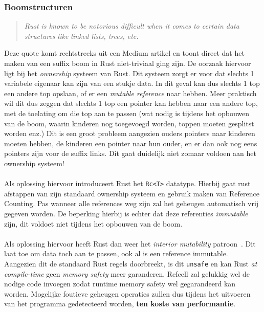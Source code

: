 \subsubsection{Boomstructuren}
\begin{quote}
    \textit{Rust is known to be notorious difficult when it comes to certain data structures like linked lists, trees, etc. \cite{rust_difficulty_quote}}
\end{quote}
Deze quote komt rechtstreeks uit een Medium artikel en toont direct dat het maken van een suffix boom in Rust niet-triviaal ging zijn.
De oorzaak hiervoor ligt bij het \textit{ownership} systeem van Rust.
Dit systeem zorgt er voor dat slechts 1 variabele eigenaar kan zijn van een stukje data.
In dit geval kan dus slechts 1 top een andere top opslaan, of er een \textit{mutable reference} naar hebben.
Meer praktisch wil dit dus zeggen dat slechts 1 top een pointer kan hebben naar een andere top, met de toelating om die top aan te passen (wat nodig is tijdens het opbouwen van de boom, waarin kinderen nog toegevoegd worden, toppen moeten gesplitst worden enz.)
Dit is een groot probleem aangezien ouders pointers naar kinderen moeten hebben, de kinderen een pointer naar hun ouder, en er dan ook nog eens pointers zijn voor de suffix links.
Dit gaat duidelijk niet zomaar voldoen aan het ownership systeem!
\\ \\
Als oplossing hiervoor introduceert Rust het \texttt{Rc<T>} datatype.
Hierbij gaat rust afstappen van zijn standaard ownership systeem en gebruik maken van Reference Counting.
Pas wanneer alle references weg zijn zal het geheugen automatisch vrij gegeven worden.
De beperking hierbij is echter dat deze referenties \textit{immutable} zijn, dit voldoet niet tijdens het opbouwen van de boom.
\\ \\
Als oplossing hiervoor heeft Rust dan weer het \textit{interior mutability} patroon~\cite{interior_mutability}.
Dit laat toe om data toch aan te passen, ook al is een reference immutable.
Aangezien dit de standaard Rust regels doorbreekt, is dit \texttt{unsafe} en kan Rust \textit{at compile-time} geen \textit{memory safety} meer garanderen.
Refcell zal gelukkig wel de nodige code invoegen zodat runtime memory safety wel gegarandeerd kan worden.
Mogelijke foutieve geheugen operaties zullen dus tijdens het uitvoeren van het programma gedetecteerd worden, \textbf{ten koste van performantie}.
\\ \\
